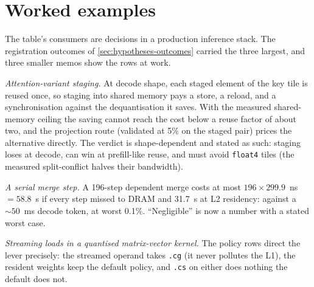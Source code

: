 \section{Worked examples}
\label{sec:worked}

The table's consumers are decisions in a production inference stack. The
registration outcomes of \cref{sec:hypotheses-outcomes} carried the three
largest, and three smaller memos show the rows at work.

\emph{Attention-variant staging.} At decode shape, each staged element of
the key tile is reused once, so staging into shared memory pays a store,
a reload, and a synchronisation against the dequantisation it saves. With
the measured shared-memory ceiling the saving cannot reach the cost below
a reuse factor of about two, and the projection route (validated at
5\% on the staged pair) prices the alternative directly. The verdict
is shape-dependent and stated as such: staging loses at decode, can win
at prefill-like reuse, and must avoid \texttt{float4} tiles (the measured
split-conflict halves their bandwidth).

\emph{A serial merge step.} A 196-step dependent merge costs at most
$196 \times 299.9$~ns $= 58.8$~\textmu s if every step missed to DRAM and
31.7~\textmu s at L2 residency: against a ${\sim}50$~ms decode token,
at worst 0.1\%. ``Negligible'' is now a number with a stated worst case.

\emph{Streaming loads in a quantised matrix-vector kernel.} The policy
rows direct the lever precisely: the streamed operand takes \texttt{.cg}
(it never pollutes the L1), the resident weights keep the default policy,
and \texttt{.cs} on either does nothing the default does not.
